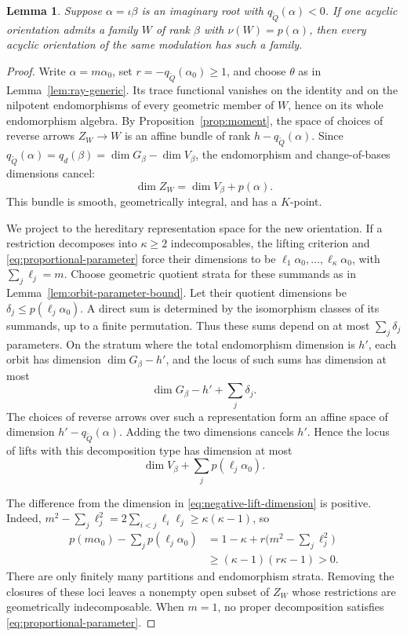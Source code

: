 \documentclass[11pt, reqno]{amsart}
\numberwithin{equation}{section}
\newtheorem{lemma}[theorem]{Lemma}
\theoremstyle{definition}
\theoremstyle{remark}
\newcommand{\Qbar}{\widetilde Q}
\begin{document}
\begin{lemma}\label{lem:negative-transport}
Suppose $\alpha=\iota\beta$ is an imaginary root with
$q_{\Qbar}(\alpha)<0$. If one acyclic orientation admits a family $W$ of rank $\beta$
with $\nu(W)=p(\alpha)$, then every
acyclic orientation of the same modulation has such a family.
\end{lemma}
\begin{proof}
Write $\alpha=m\alpha_0$, set $r=-q_{\Qbar}(\alpha_0)\ge1$,
and choose $\theta$ as in Lemma~\ref{lem:ray-generic}. Its trace functional vanishes
on the identity and on the nilpotent endomorphisms of every geometric
member of $W$, hence on its whole endomorphism algebra. By
Proposition~\ref{prop:moment}, the space of choices of reverse arrows
$Z_W\to W$ is an affine bundle of rank $h-q_{\Qbar}(\alpha)$.
Since $q_{\Qbar}(\alpha)=q_d(\beta)
=\dim G_\beta-\dim V_\beta$, the endomorphism and
change-of-bases dimensions cancel:
\begin{equation}\label{eq:negative-lift-dimension}
\dim Z_W=\dim V_\beta+p(\alpha).
\end{equation}
This bundle is smooth, geometrically integral, and has a $K$-point.

We project to the hereditary representation space for the new
orientation. If a restriction decomposes into $\kappa\ge2$ indecomposables,
the lifting criterion and \eqref{eq:proportional-parameter} force their
dimensions to be
$\ell_1\alpha_0,\ldots,\ell_\kappa\alpha_0$, with
$\sum_j\ell_j=m$. Choose geometric quotient strata for these summands as in
Lemma~\ref{lem:orbit-parameter-bound}. Let their quotient dimensions be
$\delta_j\le p(\ell_j\alpha_0)$. A direct sum is determined by the
isomorphism classes of its summands, up to a finite permutation. Thus
these sums depend on at most $\sum_j\delta_j$ parameters. On the
stratum where the total endomorphism dimension is $h'$, each orbit has
dimension $\dim G_\beta-h'$, and the locus of such sums has dimension at most
\[ \dim G_\beta-h'+\sum_j\delta_j. \]
The choices of reverse arrows over such a representation form an
affine space of dimension $h'-q_{\Qbar}(\alpha)$. Adding the two
dimensions cancels $h'$. Hence the locus of lifts with this
decomposition type has dimension at most
\[
\dim V_\beta+\sum_jp(\ell_j\alpha_0).
\]

The difference from the dimension in
\eqref{eq:negative-lift-dimension} is positive. Indeed,
$m^2-\sum_j\ell_j^2=2\sum_{i<j}\ell_i\ell_j\ge \kappa(\kappa-1)$, so
\begin{align*}
p(m\alpha_0)-\sum_jp(\ell_j\alpha_0)
 &=1-\kappa+r\Big(m^2-\sum_j\ell_j^2\Big)\\
 &\ge(\kappa-1)(r\kappa-1)>0.
\end{align*}
There are only finitely many partitions and endomorphism strata.
Removing the closures of these loci leaves a nonempty open subset
of $Z_W$ whose restrictions are geometrically indecomposable. When
$m=1$, no proper decomposition satisfies \eqref{eq:proportional-parameter}.



\end{proof}
\end{document}
